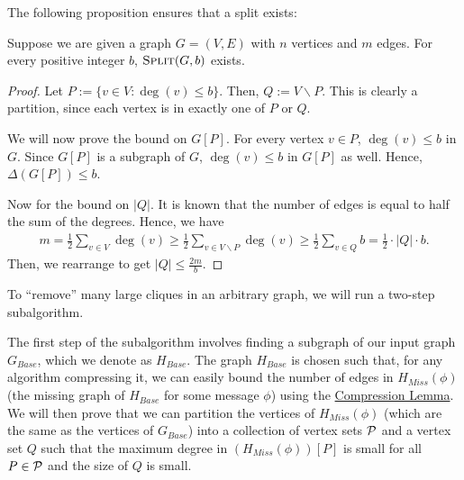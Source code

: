 \documentclass[11pt]{article}
\begin{document}
\noindent
The following proposition ensures that a split exists:

\begin{proposition}\label{partition-degree-bound}
Suppose we are given a graph $G=(V, E)$ with $n$ vertices and $m$ edges. For every positive integer $b$, $\textnormal{\textsc{Split}}(G, b)$ exists.
\end{proposition}
\begin{proof}
Let $P:=\{v\in V:\deg{(v)}\le b\}$. Then, $Q:=V\backslash P$. This is clearly a partition, since each vertex is in exactly one of $P$ or $Q$. 

We will now prove the bound on $G[P]$. For every vertex $v\in P$, $\deg{(v)}\le b$ in $G$. Since $G[P]$ is a subgraph of $G$, $\deg{(v)}\le b$ in $G[P]$ as well. Hence, $\Delta{(G[P])}\le b$. 

Now for the bound on $|Q|$. It is known that the number of edges is equal to half the sum of the degrees. Hence, we have 
\begin{align*}
    m=\frac12\sum_{v\in V}\deg{(v)}\ge \frac12\sum_{v\in V\backslash P}\deg{(v)}\ge \frac 12\sum_{v\in Q} b=\frac 12\cdot |Q|\cdot b.
\end{align*}
Then, we rearrange to get $|Q|\le \frac{2m}b$. 
\end{proof}

To ``remove'' many large cliques in an arbitrary graph, we will run a two-step subalgorithm. 

The first step of the subalgorithm involves finding a subgraph of our input graph $G_{Base}$, which we denote as $H_{Base}$. The graph $H_{Base}$ is chosen such that, for any algorithm compressing it, we can easily bound the number of edges in $H_{Miss}(\phi)$ (the missing graph of $H_{Base}$ for some message $\phi$) using the \hyperref[compression]{Compression Lemma}. We will then prove that we can partition the vertices of $H_{Miss}(\phi)$ (which are the same as the vertices of $G_{Base}$) into a collection of vertex sets $\mathcal{P}$ and a vertex set $Q$ such that the maximum degree in $\left(H_{Miss}(\phi)\right)[P]$ is small for all $P\in \mathcal{P}$ and the size of $Q$ is small. 
\end{document}
